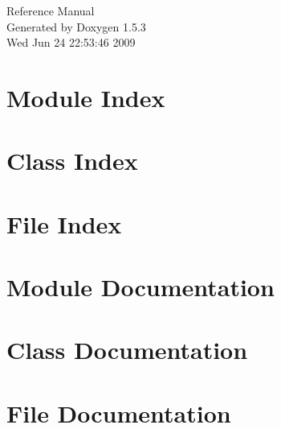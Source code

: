 \documentclass[a4paper]{book}
\begin{document}
\begin{titlepage}
\vspace*{7cm}
\begin{center}
{\Large Reference Manual}\\
\vspace*{1cm}
{\large Generated by Doxygen 1.5.3}\\
\vspace*{0.5cm}
{\small Wed Jun 24 22:53:46 2009}\\
\end{center}
\end{titlepage}
\clearemptydoublepage
{}
\tableofcontents
\clearemptydoublepage
{}
\chapter{Module Index}

\chapter{Class Index}

\chapter{File Index}

\chapter{Module Documentation}


\chapter{Class Documentation}










\chapter{File Documentation}




\printindex
\end{document}
